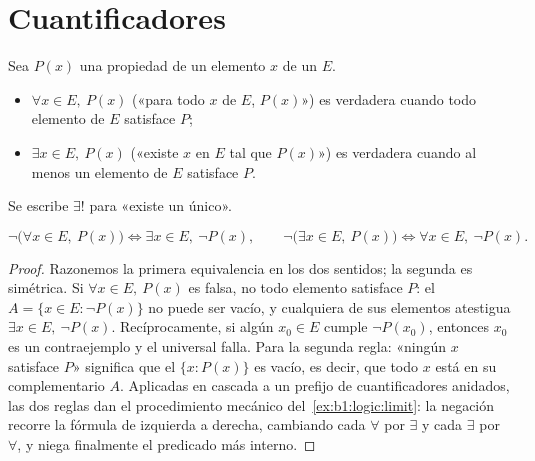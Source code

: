 \section{Cuantificadores}

\begin{definition}[Cuantificadores]\label{def:b1:logic:quantifiers}
Sea $P(x)$ una propiedad de un elemento $x$ de un  $E$.
\begin{itemize}
  \item $\forall x \in E,\ P(x)$ («para todo $x$ de $E$, $P(x)$») es
        verdadera cuando todo elemento de $E$ satisface $P$;
  \item $\exists x \in E,\ P(x)$ («existe $x$ en $E$ tal que $P(x)$»)
        es verdadera cuando al menos un elemento de $E$ satisface $P$.
\end{itemize}
Se escribe $\exists!$ para «existe un único».
\end{definition}

\begin{proposition}\label{prop:b1:logic:negquant}
\[
\lnot\bigl(\forall x \in E,\ P(x)\bigr) \iff
\exists x \in E,\ \lnot P(x),
\qquad
\lnot\bigl(\exists x \in E,\ P(x)\bigr) \iff
\forall x \in E,\ \lnot P(x).
\]
\end{proposition}

\begin{proof}
Razonemos la primera equivalencia en los dos sentidos; la segunda es
simétrica. Si $\forall x \in E,\ P(x)$ es falsa, no todo elemento
satisface $P$: el  $A = \{x \in E : \lnot P(x)\}$ no puede ser
vacío, y cualquiera de sus elementos atestigua $\exists x \in
E,\ \lnot P(x)$. Recíprocamente, si algún $x_0 \in E$ cumple $\lnot
P(x_0)$, entonces $x_0$ es un contraejemplo y el  universal
falla. Para la segunda regla: «ningún $x$ satisface $P$» significa que
el  $\{x : P(x)\}$ es vacío, es decir, que todo $x$ está en su
complementario $A$. Aplicadas en cascada a un prefijo de cuantificadores
anidados, las dos reglas dan el procedimiento mecánico del~\cref{ex:b1:logic:limit}:
la negación recorre la fórmula de izquierda a derecha, cambiando cada
$\forall$ por $\exists$ y cada $\exists$ por $\forall$, y niega
finalmente el predicado más interno.
\end{proof}

